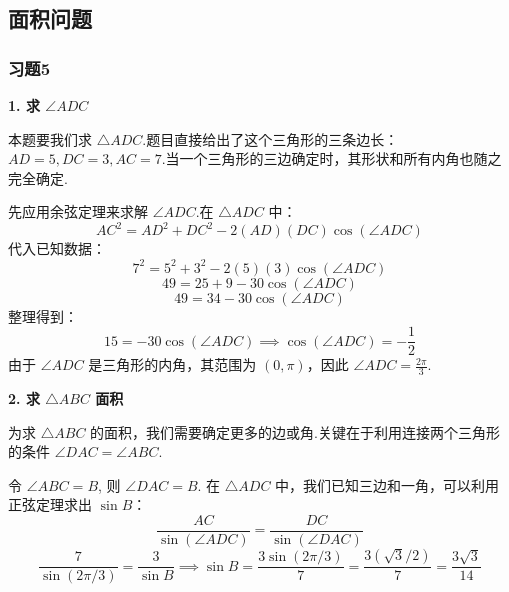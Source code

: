 \subsection*{面积问题}

\subsubsection{习题5}
\begin{solution}
	\textbf{1. 求 $\angle ADC$}
	
	本题要我们求 $\triangle ADC$.题目直接给出了这个三角形的三条边长：$AD=5, DC=3, AC=7$.当一个三角形的三边确定时，其形状和所有内角也随之完全确定.
	
	先应用余弦定理来求解 $\angle ADC$.在 $\triangle ADC$ 中：
	\[
	AC^2 = AD^2 + DC^2 - 2(AD)(DC)\cos(\angle ADC)
	\]
	代入已知数据：
	\[
	7^2 = 5^2 + 3^2 - 2(5)(3)\cos(\angle ADC)
	\]
	\[
	49 = 25 + 9 - 30\cos(\angle ADC)
	\]
	\[
	49 = 34 - 30\cos(\angle ADC)
	\]
	整理得到：
	\[
	15 = -30\cos(\angle ADC) \implies \cos(\angle ADC) = -\frac{1}{2}
	\]
	由于 $\angle ADC$ 是三角形的内角，其范围为 $(0, \pi)$，因此 $\angle ADC = \frac{2\pi}{3}$.
	
	\textbf{2. 求 $\triangle ABC$ 面积}
	
	为求 $\triangle ABC$ 的面积，我们需要确定更多的边或角.关键在于利用连接两个三角形的条件 $\angle DAC = \angle ABC$.
	
	令 $\angle ABC = B$, 则 $\angle DAC = B$.
	在 $\triangle ADC$ 中，我们已知三边和一角，可以利用正弦定理求出 $\sin B$：
	\[
	\frac{AC}{\sin(\angle ADC)} = \frac{DC}{\sin(\angle DAC)}
	\]
	\[
	\frac{7}{\sin(2\pi/3)} = \frac{3}{\sin B} \implies \sin B = \frac{3\sin(2\pi/3)}{7} = \frac{3(\sqrt{3}/2)}{7} = \frac{3\sqrt{3}}{14}
	\]
	

\end{solution}
